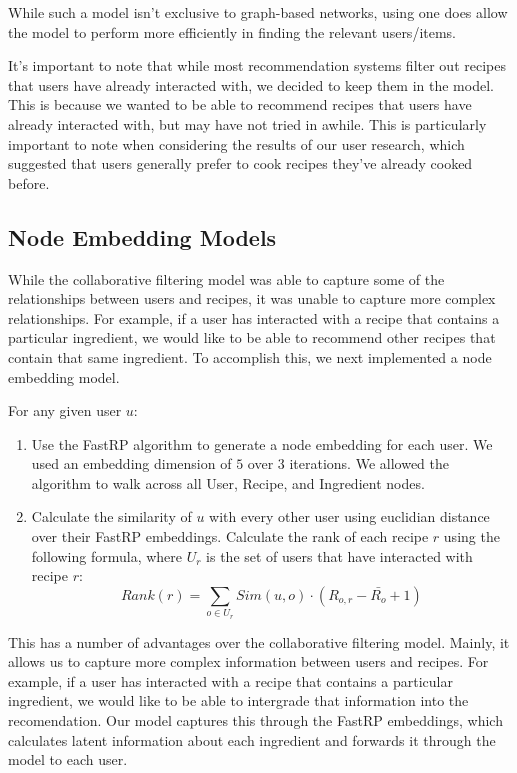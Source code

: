 \documentclass{article}
\begin{document}

While such a model isn't exclusive to graph-based networks, using one does allow the model to perform more efficiently in finding the relevant users/items.

It's important to note that while most recommendation systems filter out recipes that users have already interacted with, we decided to keep them in the model. This is because we wanted to be able to recommend recipes that users have already interacted with, but may have not tried in awhile. This is particularly important to note when considering the results of our user research, which suggested that users generally prefer to cook recipes they've already cooked before.

\subsection{Node Embedding Models}

While the collaborative filtering model was able to capture some of the relationships between users and recipes, it was unable to capture more complex relationships. For example, if a user has interacted with a recipe that contains a particular ingredient, we would like to be able to recommend other recipes that contain that same ingredient. To accomplish this, we next implemented a node embedding model.

For any given user $u$:
\begin{enumerate}
  \item Use the FastRP algorithm \citep{fastRP} to generate a node embedding for each user.
        \subitem We used an embedding dimension of $5$ over $3$ iterations.
        \subitem We allowed the algorithm to walk across all User, Recipe, and Ingredient nodes.
  \item Calculate the similarity of $u$ with every other user using euclidian distance over their FastRP embeddings.
        Calculate the rank of each recipe $r$ using the following formula, where $U_r$ is the set of users that have interacted with recipe $r$:
        $$
          Rank(r) = \sum_{o \in U_r} Sim(u, o) \cdot (R_{o, r} - \bar{R_o} + 1)
        $$
\end{enumerate}

This has a number of advantages over the collaborative filtering model. Mainly, it allows us to capture more complex information between users and recipes. For example, if a user has interacted with a recipe that contains a particular ingredient, we would like to be able to intergrade that information into the recomendation. Our model captures this through the FastRP embeddings, which calculates latent information about each ingredient and forwards it through the model to each user.
\end{document}
